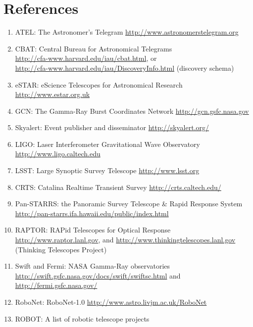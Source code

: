 \documentclass[11pt,a4paper]{ivoa}
\begin{document}

%
\section{References}
\begin{enumerate}
\item\label{bib01} ATEL: The Astronomer's Telegram \url{http://www.astronomerstelegram.org} 
\item\label{bib02} CBAT: Central Bureau for Astronomical Telegrams \\
\url{http://cfa-www.harvard.edu/iau/cbat.html}, or\\ 
\url{http://cfa-www.harvard.edu/iau/DiscoveryInfo.html} (discovery schema) 
\item\label{bib03} eSTAR: eScience Telescopes for Astronomical Research \url{http://www.estar.org.uk}
\item\label{bib04} GCN: The Gamma-Ray Burst Coordinates Network \url{http://gcn.gsfc.nasa.gov}
\item\label{bib05} Skyalert: Event publisher and disseminator \url{http://skyalert.org/}
\item\label{bib06} LIGO: Laser Interferometer Gravitational Wave Observatory \url{http://www.ligo.caltech.edu} 
\item\label{bib07} LSST: Large Synoptic Survey Telescope \url{http://www.lsst.org} 
\item\label{bib08} CRTS: Catalina Realtime Transient Survey \url{http://crts.caltech.edu/} 
\item\label{bib09} Pan-STARRS: the Panoramic Survey Telescope \& Rapid Response System\\
\url{http://pan-starrs.ifa.hawaii.edu/public/index.html}
\item\label{bib10} RAPTOR: RAPid Telescopes for Optical Response \\
\url{http://www.raptor.lanl.gov}, and \url{http://www.thinkingtelescopes.lanl.gov} (Thinking Telescopes Project) 
\item\label{bib11} Swift and Fermi: NASA Gamma-Ray observatories\\
\url{http://swift.gsfc.nasa.gov/docs/swift/swiftsc.html} and \url{http://fermi.gsfc.nasa.gov/} 
\item\label{bib12} RoboNet: RoboNet-1.0 \url{http://www.astro.livjm.ac.uk/RoboNet}
\item\label{bib13} ROBOT: A list of robotic telescope projects \\

\end{enumerate}
\end{document}
